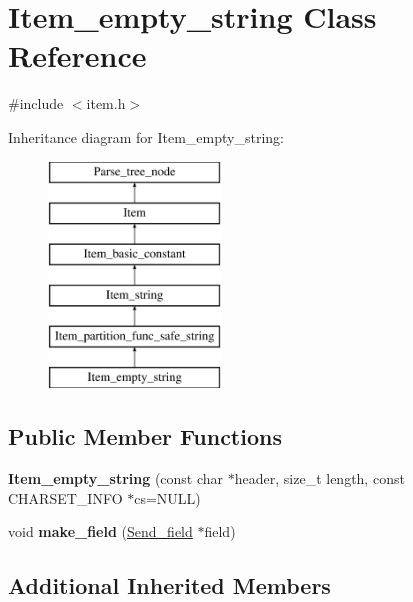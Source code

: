 \hypertarget{classItem__empty__string}{}\section{Item\+\_\+empty\+\_\+string Class Reference}
\label{classItem__empty__string}


{\ttfamily \#include $<$item.\+h$>$}

Inheritance diagram for Item\+\_\+empty\+\_\+string\+:\begin{figure}[H]
\begin{center}
\leavevmode
\includegraphics[height=6.000000cm]{classItem__empty__string}
\end{center}
\end{figure}
\subsection*{Public Member Functions}
\begin{DoxyCompactItemize}
\item 
\mbox{\label{classItem__empty__string_a232018d0c4cf9e4f9fbb6d3a0c908001}} 
{\bfseries Item\+\_\+empty\+\_\+string} (const char $\ast$header, size\+\_\+t length, const C\+H\+A\+R\+S\+E\+T\+\_\+\+I\+N\+FO $\ast$cs=N\+U\+LL)
\item 
\mbox{\label{classItem__empty__string_afa223942cfb9fd7e524a5f3644c1cfde}} 
void {\bfseries make\+\_\+field} (\mbox{\hyperlink{classSend__field}{Send\+\_\+field}} $\ast$field)
\end{DoxyCompactItemize}
\subsection*{Additional Inherited Members}


